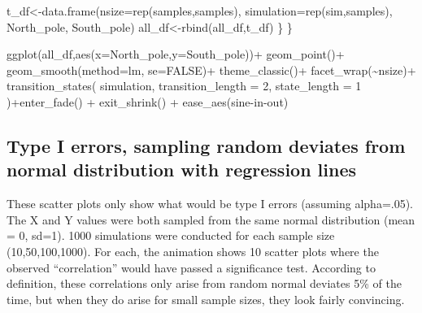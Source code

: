 \documentclass[
  letterpaper,
  DIV=11,
  numbers=noendperiod]{scrreprt}
\newenvironment{Shaded}{\begin{snugshade}}{\end{snugshade}}
\newcommand{\AttributeTok}[1]{\textcolor[rgb]{0.40,0.45,0.13}{#1}}
\newcommand{\ConstantTok}[1]{\textcolor[rgb]{0.56,0.35,0.01}{#1}}
\newcommand{\DecValTok}[1]{\textcolor[rgb]{0.68,0.00,0.00}{#1}}
\newcommand{\FunctionTok}[1]{\textcolor[rgb]{0.28,0.35,0.67}{#1}}
\newcommand{\NormalTok}[1]{\textcolor[rgb]{0.00,0.23,0.31}{#1}}
\newcommand{\OtherTok}[1]{\textcolor[rgb]{0.00,0.23,0.31}{#1}}
\newcommand{\SpecialCharTok}[1]{\textcolor[rgb]{0.37,0.37,0.37}{#1}}
\newcommand{\StringTok}[1]{\textcolor[rgb]{0.13,0.47,0.30}{#1}}
\begin{document}
\begin{Shaded}
\begin{Highlighting}[]
\NormalTok{    t\_df}\OtherTok{\textless{}{-}}\FunctionTok{data.frame}\NormalTok{(}\AttributeTok{nsize=}\FunctionTok{rep}\NormalTok{(samples,samples),}
                   \AttributeTok{simulation=}\FunctionTok{rep}\NormalTok{(sim,samples),}
\NormalTok{                                  North\_pole,}
\NormalTok{                                  South\_pole)}
\NormalTok{  all\_df}\OtherTok{\textless{}{-}}\FunctionTok{rbind}\NormalTok{(all\_df,t\_df)}
\NormalTok{  \}}
\NormalTok{\}}

\FunctionTok{ggplot}\NormalTok{(all\_df,}\FunctionTok{aes}\NormalTok{(}\AttributeTok{x=}\NormalTok{North\_pole,}\AttributeTok{y=}\NormalTok{South\_pole))}\SpecialCharTok{+}
  \FunctionTok{geom\_point}\NormalTok{()}\SpecialCharTok{+}
  \FunctionTok{geom\_smooth}\NormalTok{(}\AttributeTok{method=}\NormalTok{lm, }\AttributeTok{se=}\ConstantTok{FALSE}\NormalTok{)}\SpecialCharTok{+}
  \FunctionTok{theme\_classic}\NormalTok{()}\SpecialCharTok{+}
  \FunctionTok{facet\_wrap}\NormalTok{(}\SpecialCharTok{\textasciitilde{}}\NormalTok{nsize)}\SpecialCharTok{+}
  \FunctionTok{transition\_states}\NormalTok{(}
\NormalTok{    simulation,}
    \AttributeTok{transition\_length =} \DecValTok{2}\NormalTok{,}
    \AttributeTok{state\_length =} \DecValTok{1}
\NormalTok{  )}\SpecialCharTok{+}\FunctionTok{enter\_fade}\NormalTok{() }\SpecialCharTok{+} 
  \FunctionTok{exit\_shrink}\NormalTok{() }\SpecialCharTok{+}
  \FunctionTok{ease\_aes}\NormalTok{(}\StringTok{\textquotesingle{}sine{-}in{-}out\textquotesingle{}}\NormalTok{)}
\end{Highlighting}
\end{Shaded}

\subsection{Type I errors, sampling random deviates from normal
distribution with regression
lines}\label{type-i-errors-sampling-random-deviates-from-normal-distribution-with-regression-lines}

These scatter plots only show what would be type I errors (assuming
alpha=.05). The X and Y values were both sampled from the same normal
distribution (mean = 0, sd=1). 1000 simulations were conducted for each
sample size (10,50,100,1000). For each, the animation shows 10 scatter
plots where the observed ``correlation'' would have passed a
significance test. According to definition, these correlations only
arise from random normal deviates 5\% of the time, but when they do
arise for small sample sizes, they look fairly convincing.
\end{document}
